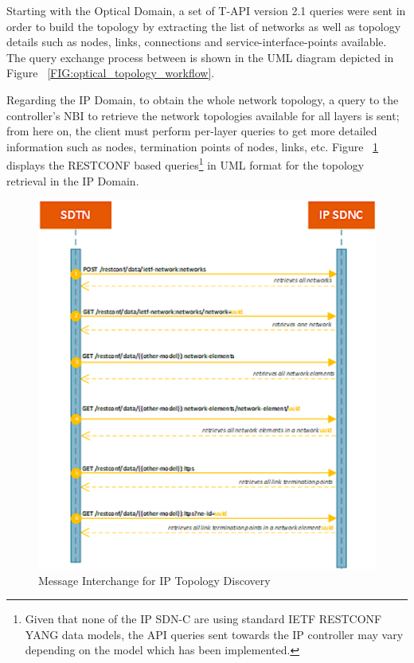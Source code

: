 \documentclass[a4paper,fleqn]{cas-dc}
\begin{document}
Starting with the Optical Domain, a set of T-API version 2.1 queries were sent in order to build the topology by extracting the list of networks as well as topology details such as nodes, links, connections and service-interface-points available. The query exchange process between is shown in the UML diagram depicted in Figure ~\ref{FIG:optical_topology_workflow}.  

Regarding the IP Domain, to obtain the whole network topology, a query to the controller’s NBI to retrieve the network topologies available for all layers is sent; from here on, the client must perform per-layer queries to get more detailed information such as nodes, termination points of nodes, links, etc. Figure ~\ref{FIG:ip_topology_workflow} displays the RESTCONF based queries\footnote{Given that none of the IP SDN-C are using standard IETF RESTCONF YANG data models, the API queries sent towards the IP controller may vary depending on the model which has been implemented. } in UML format for the topology retrieval in the IP Domain. 

\begin{figure}
	\centering
		\includegraphics[width=\linewidth]{figs/ip_topology_workflow_2.png}
	\caption{Message Interchange for IP Topology Discovery}
	\label{FIG:ip_topology_workflow}
\end{figure}
\end{document}
